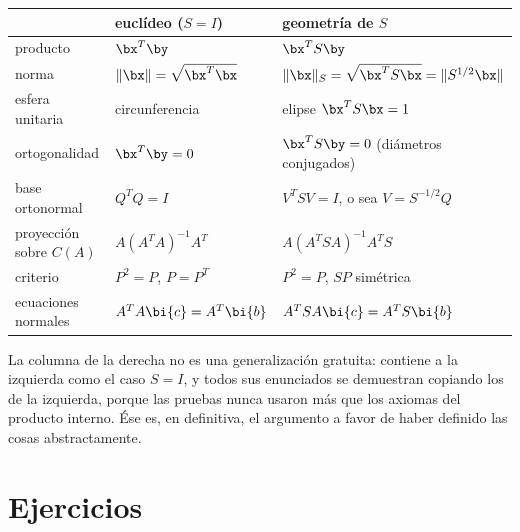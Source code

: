 \begin{center}
\renewcommand{\arraystretch}{1.35}
\begin{tabular}{@{}lll@{}}
\hline
 & \textbf{euclídeo} ($S=I$) & \textbf{geometría de $S$}\\
\hline
producto & $\bx^T\by$ & $\bx^TS\by$\\
norma & $\|\bx\|=\sqrt{\bx^T\bx}$ & $\|\bx\|_S=\sqrt{\bx^TS\bx}=\|S^{1/2}\bx\|$\\
esfera unitaria & circunferencia & elipse $\bx^TS\bx=1$\\
ortogonalidad & $\bx^T\by=0$ & $\bx^TS\by=0$ (diámetros conjugados)\\
base ortonormal & $Q^TQ=I$ & $V^TSV=I$, o sea $V=S^{-1/2}Q$\\
proyección sobre $C(A)$ & $A(A^TA)^{-1}A^T$ & $A(A^TSA)^{-1}A^TS$\\
criterio & $P^2=P$, $P=P^T$ & $P^2=P$, $SP$ simétrica\\
ecuaciones normales & $A^TA\bi{c}=A^T\bi{b}$ & $A^TSA\bi{c}=A^TS\bi{b}$\\
\hline
\end{tabular}
\end{center}

\medskip
La columna de la derecha no es una generalización gratuita: contiene a la
izquierda como el caso $S=I$, y todos sus enunciados se demuestran copiando
los de la izquierda, porque las pruebas nunca usaron más que los axiomas del
producto interno. Ése es, en definitiva, el argumento a favor de haber
definido las cosas abstractamente.


\section*{Ejercicios}

